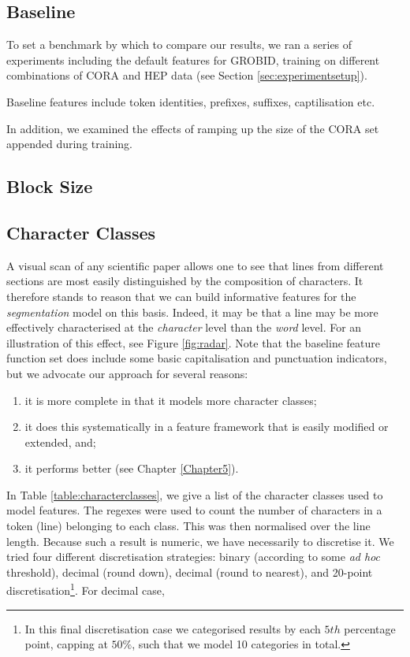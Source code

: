 \subsection{Baseline}

To set a benchmark by which to compare our results, we ran a series of experiments including the default features for GROBID, training on different combinations of CORA and HEP data (see Section \ref{sec:experimentsetup}).

Baseline features include token identities, prefixes, suffixes, captilisation etc.

In addition, we examined the effects of ramping up the size of the CORA set appended during training.

\subsection{Block Size}

\subsection{Character Classes}

A visual scan of any scientific paper allows one to see that lines from different sections are most easily distinguished by the composition of characters. It therefore stands to reason that we can build informative features for the \emph{segmentation} model on this basis. Indeed, it may be that a line may be more effectively characterised at the \emph{character} level than the \emph{word} level. For an illustration of this effect, see Figure \ref{fig:radar}. Note that the baseline feature function set does include some basic capitalisation and punctuation indicators, but we advocate our approach for several reasons:

\begin{enumerate}
\item it is more complete in that it models more character classes;
\item it does this systematically in a feature framework that is easily modified or extended, and;
\item it performs better (see Chapter \ref{Chapter5}).
\end{enumerate}

In Table \ref{table:characterclasses}, we give a list of the character classes used to model features. The regexes were used to count the number  of characters in a token (line) belonging to each class. This was then normalised over the line length. Because such a result is numeric, we have necessarily to discretise it. We tried four different discretisation strategies: binary (according to some \emph{ad hoc} threshold), decimal (round down), decimal (round to nearest), and 20-point discretisation\footnote{In this final discretisation case we categorised results by each $5th$ percentage point, capping at $50\%$, such that we model 10 categories in total.}. For decimal case,

